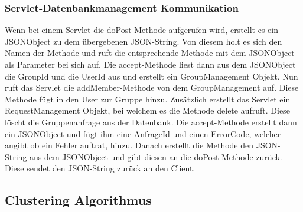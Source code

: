 \subsubsection{Servlet-Datenbankmanagement Kommunikation}
\begin {center}
\end {center}
Wenn bei einem Servlet die doPost Methode aufgerufen wird, erstellt es ein JSONObject zu dem übergebenen JSON-String.
Von diesem holt es sich den Namen der Methode und ruft die entsprechende Methode mit dem JSONObject als Parameter bei sich auf. Die accept-Methode liest dann aus dem JSONObject die GroupId und die UserId aus und erstellt ein GroupManagement Objekt.
Nun ruft das Servlet die addMember-Methode von dem GroupManagement auf. Diese Methode fügt in den User zur Gruppe hinzu. Zusätzlich erstellt das Servlet ein RequestManagement Objekt, bei welchem es die Methode delete aufruft. Diese löscht die Gruppenanfrage aus der Datenbank. Die accept-Methode erstellt dann ein JSONObject und fügt ihm eine AnfrageId und einen ErrorCode, welcher angibt ob ein Fehler auftrat, hinzu. Danach erstellt die Methode den JSON-String aus dem JSONObject und gibt diesen an die doPost-Methode zurück. Diese sendet den JSON-String zurück an den Client.

\subsection{Clustering Algorithmus}
	
	\newpage